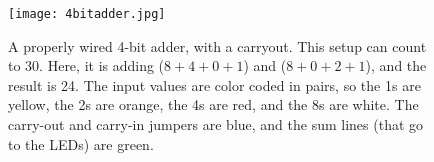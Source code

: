 \begin{figure}
\texttt{[image: 4bitadder.jpg]}
\caption{A properly wired 4-bit adder, with a carryout. This setup can count to 30. Here, it is adding ($8 + 4 + 0 + 1$) and ($8 + 0 + 2 + 1$), and the result is 24. The input values are color coded in pairs, so the 1s are yellow, the 2s are orange, the 4s are red, and the 8s are white. The carry-out and carry-in jumpers are blue, and the sum lines (that go to the LEDs) are green.}

\end{figure}

